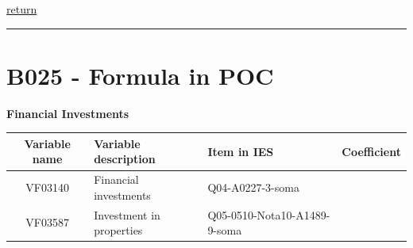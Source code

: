 \documentclass[]{book}
\begin{document}
\protect\hyperlink{assets}{return}

\begin{center}\rule{0.5\linewidth}{\linethickness}\end{center}

\hypertarget{b025---formula-in-poc}{%
\section{B025 - Formula in POC}\label{b025---formula-in-poc}}

\textbf{Financial Investments}

\begin{longtable}[]{@{}cllc@{}}
\toprule
\begin{minipage}[b]{0.13\columnwidth}\centering
Variable name\strut
\end{minipage} & \begin{minipage}[b]{0.31\columnwidth}\raggedright
Variable description\strut
\end{minipage} & \begin{minipage}[b]{0.33\columnwidth}\raggedright
Item in IES\strut
\end{minipage} & \begin{minipage}[b]{0.11\columnwidth}\centering
Coefficient\strut
\end{minipage}\tabularnewline
\midrule
\endhead
\begin{minipage}[t]{0.13\columnwidth}\centering
VF03140\strut
\end{minipage} & \begin{minipage}[t]{0.31\columnwidth}\raggedright
Financial investments\strut
\end{minipage} & \begin{minipage}[t]{0.33\columnwidth}\raggedright
Q04-A0227-3-soma\strut
\end{minipage} & \begin{minipage}[t]{0.11\columnwidth}\centering
1\strut
\end{minipage}\tabularnewline
\begin{minipage}[t]{0.13\columnwidth}\centering
VF03587\strut
\end{minipage} & \begin{minipage}[t]{0.31\columnwidth}\raggedright
Investment in properties\strut
\end{minipage} & \begin{minipage}[t]{0.33\columnwidth}\raggedright
Q05-0510-Nota10-A1489-9-soma\strut
\end{minipage} & \begin{minipage}[t]{0.11\columnwidth}\centering

\end{minipage}
\end{longtable}
\end{document}

